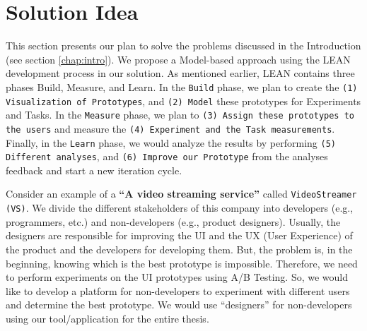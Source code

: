 \chapter{Solution Idea} \label{chap:solutionideas}

This section presents our plan to solve the problems discussed in the Introduction (see section \ref{chap:intro}).
We propose a Model-based approach using the LEAN development process in our solution.
As mentioned earlier, LEAN contains three phases Build, Measure, and Learn.
In the \texttt{Build} phase, we plan to create the \texttt{(1) Visualization of Prototypes}, and \texttt{(2) Model} these prototypes for Experiments and Tasks.
In the \texttt{Measure} phase, we plan to \texttt{(3) Assign these prototypes to the users} and measure the \texttt{(4) Experiment and the Task measurements}.
Finally, in the \texttt{Learn} phase, we would analyze the results by performing \texttt{(5) Different analyses}, and \texttt{(6) Improve our Prototype} from the analyses feedback and start a new iteration cycle. 

Consider an example of a \textbf{``A video streaming service''} called \texttt{VideoStreamer (VS)}.
We divide the different stakeholders of this company into developers (e.g., programmers, etc.) and non-developers (e.g., product designers).
Usually, the designers are responsible for improving the UI and the UX (User Experience) of the product and the developers for developing them.
But, the problem is, in the beginning, knowing which is the best prototype is impossible.
Therefore, we need to perform experiments on the UI prototypes using A/B Testing.
So, we would like to develop a platform for non-developers to experiment with different users and determine the best prototype.
We would use ``designers'' for non-developers using our tool/application for the entire thesis.

